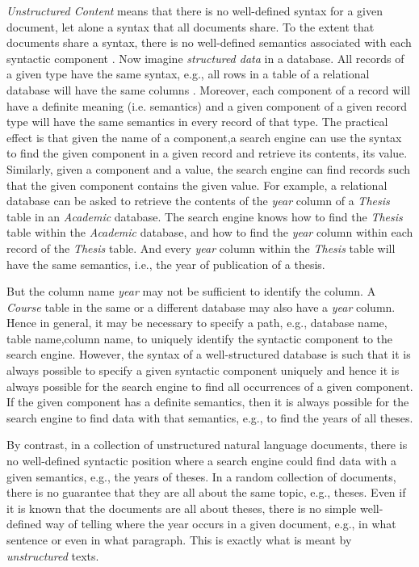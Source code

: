 \textit{Unstructured Content} means that there is no well-defined syntax for a given document, let alone a syntax that all documents share. To the extent that documents share a syntax, there is no well-defined semantics associated with each syntactic component \citep{greengrass2000}. Now imagine \textit{structured data} in a database. All records of a given type have the same syntax, e.g., all rows in a table of a relational database will have the same columns \citep{Salton1983}.  Moreover,  each  component  of  a  record  will  have  a  definite meaning (i.e. semantics)  and  a  given  component  of  a  given  record  type  will  have  the  same semantics in every record of that type. The practical effect is that given the name of a component,a search engine can use the syntax to find the given component in a given record and retrieve its contents, its value. Similarly, given a component and a value, the search engine can find records such that the given component contains the given value. For example, a relational database can be asked to retrieve the contents of the \textit{year} column of a \textit{Thesis} table in an \textit{Academic} database. The search engine knows how to find the \textit{Thesis} table within  the  \textit{Academic}  database,  and  how  to  find  the  \textit{year}  column  within  each  record  of  the \textit{Thesis} table.  And  every  \textit{year}  column  within  the  \textit{Thesis}  table  will  have  the  same semantics, i.e., the year of publication of a thesis. 

But the column name \textit{year} may not be sufficient to identify the column. A \textit{Course} table in the same or a different database may also have a \textit{year} column. Hence in general, it may be necessary to specify a path, e.g., database name, table name,column name, to uniquely identify the syntactic component to the search engine. However, the syntax of a well-structured database is such that it is always possible to specify a given syntactic component uniquely and hence it is always possible for the search engine to find all occurrences of a given component. If the given component has a definite semantics, then it is always possible for the search engine to find data with that semantics, e.g., to find the years of all theses. 

By contrast, in a collection of unstructured natural language documents, there is no well-defined syntactic position where a search engine could find data with a given semantics, e.g., the years of theses. In a random collection of documents, there is no guarantee that they are all about the same topic, e.g., theses. Even if it is known that the documents are all about theses, there is no simple well-defined way of telling where the year occurs in a given document, e.g., in what sentence or even in what paragraph. This is exactly what is meant by \textit{unstructured} texts.

